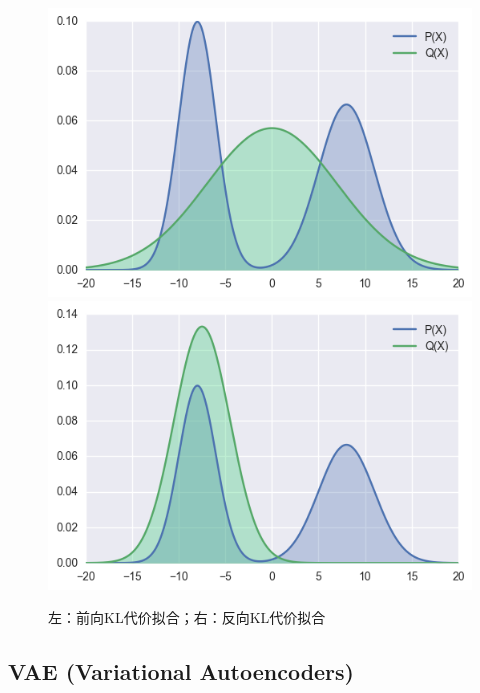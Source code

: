 \documentclass[12pt,a4paper,UTF8]{article}
\begin{document}
\begin{enumerate}
\begin{figure}[htb]\centering\includegraphics[scale=0.6]{./figure/1.png}\includegraphics[scale=0.6]{./figure/2.png}\caption{左：前向KL代价拟合；右：反向KL代价拟合}\label{kl_img}\end{figure}

\end{enumerate}

\subsection{VAE (Variational Autoencoders)}
\end{document}
